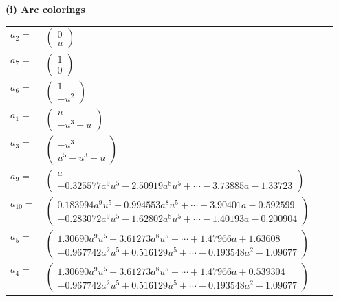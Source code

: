 \documentclass[1p]{elsarticle_modified}
\theoremstyle{definition}
\begin{document}
\flushleft \textbf{(i) Arc colorings}\\
\begin{tabular}{m{7pt} m{180pt} m{7pt} m{180pt} }
\flushright $a_{2}=$&$\begin{pmatrix}0\\u\end{pmatrix}$ \\
\flushright $a_{7}=$&$\begin{pmatrix}1\\0\end{pmatrix}$ \\
\flushright $a_{6}=$&$\begin{pmatrix}1\\- u^2\end{pmatrix}$ \\
\flushright $a_{1}=$&$\begin{pmatrix}u\\- u^3+u\end{pmatrix}$ \\
\flushright $a_{3}=$&$\begin{pmatrix}- u^3\\u^5- u^3+u\end{pmatrix}$ \\
\flushright $a_{9}=$&$\begin{pmatrix}a\\-0.325577 a^{9} u^{5}-2.50919 a^{8} u^{5}+\cdots-3.73885 a-1.33723\end{pmatrix}$ \\
\flushright $a_{10}=$&$\begin{pmatrix}0.183994 a^{9} u^{5}+0.994553 a^{8} u^{5}+\cdots+3.90401 a-0.592599\\-0.283072 a^{9} u^{5}-1.62802 a^{8} u^{5}+\cdots-1.40193 a-0.200904\end{pmatrix}$ \\
\flushright $a_{5}=$&$\begin{pmatrix}1.30690 a^{9} u^{5}+3.61273 a^{8} u^{5}+\cdots+1.47966 a+1.63608\\-0.967742 a^{2} u^{5}+0.516129 u^{5}+\cdots-0.193548 a^{2}-1.09677\end{pmatrix}$ \\
\flushright $a_{4}=$&$\begin{pmatrix}1.30690 a^{9} u^{5}+3.61273 a^{8} u^{5}+\cdots+1.47966 a+0.539304\\-0.967742 a^{2} u^{5}+0.516129 u^{5}+\cdots-0.193548 a^{2}-1.09677\end{pmatrix}$ \\

\end{tabular}
\end{document}

